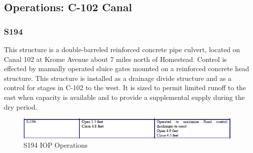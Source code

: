 

\clearpage
\subsection{Operations: C-102 Canal}

\subsubsection{S194}

This structure is a double-barreled reinforced concrete pipe culvert, located on Canal 102 at Krome Avenue about 7 miles north of Homestead. Control is effected by manually operated sluice gates mounted on a reinforced concrete head structure. This structure is installed as a drainage divide structure and as a control for stages in C-102 to the west. It is sized to permit limited runoff to the east when capacity is available and to provide a supplemental supply during the dry period.


%
%

\begin{figure}[!h]
  \begin{center}
  \includegraphics[width=6.5in]{../figs/S194_IOPops.png}
  \caption{S194 IOP Operations}
  \label{fig:S194iop}
  \end{center}
\end{figure}

